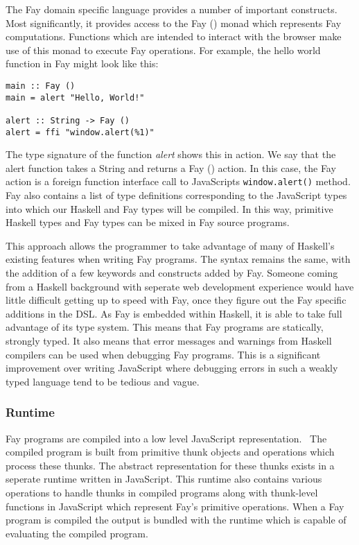 The Fay domain specific language provides a number of important 
constructs. Most significantly, it provides access to the Fay () monad
which represents Fay computations. Functions which are intended to interact
with the browser make use of this monad to execute Fay operations. For
example, the hello world function in Fay might look like this:

\begin{verbatim}
main :: Fay ()
main = alert "Hello, World!"

alert :: String -> Fay ()
alert = ffi "window.alert(%1)"
\end{verbatim}

The type signature of the function \emph{alert} shows this in action.
We say that the alert function takes a String and returns a Fay () action.
In this case, the Fay action is a foreign function interface call to
JavaScripts \verb!window.alert()! method.  Fay also contains a list of type 
definitions corresponding to the JavaScript types into which our Haskell
and Fay types will be compiled. In this way, primitive Haskell types and 
Fay types can be mixed in Fay source programs. 

This approach allows the programmer to take advantage of many of Haskell's
existing features when writing Fay programs. The syntax remains the same,
with the addition of a few keywords and constructs added by Fay. Someone
coming from a Haskell background with seperate web development experience
would have little difficult getting up to speed with Fay, once they figure
out the Fay specific additions in the DSL. As Fay is embedded within Haskell,
it is able to take full advantage of its type system. This means that Fay
programs are statically, strongly typed. It also means that error messages and warnings from 
Haskell compilers can be used when debugging Fay programs. This is a significant
improvement over writing JavaScript where debugging errors in such a weakly
typed language tend to be tedious and vague. 

\subsubsection{Runtime}
Fay programs are compiled into a low level JavaScript representation.~\cite{Fay}
 The
compiled program is built from primitive thunk objects and operations
which process these thunks. The abstract representation for these thunks 
exists in a seperate runtime written in JavaScript. This runtime also contains
various operations to handle thunks in compiled programs along with thunk-level 
functions in JavaScript which represent Fay's primitive operations. When a
Fay program is compiled the output is bundled with the runtime which is 
capable of evaluating the compiled program. 

